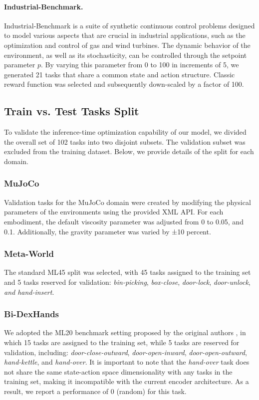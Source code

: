 \documentclass{article}
\theoremstyle{plain}
\theoremstyle{definition}
\theoremstyle{remark}
\begin{document}
\paragraph{Industrial-Benchmark.} Industrial-Benchmark \cite{Hein_2017} is a suite of synthetic continuous control problems designed to model various aspects that are crucial in industrial applications, such as the optimization and control of gas and wind turbines. The dynamic behavior of the environment, as well as its stochasticity, can be controlled through the setpoint parameter $p$. By varying this parameter from 0 to 100 in increments of 5, we generated 21 tasks that share a common state and action structure. Classic reward function was selected and subsequently down-scaled by a factor of 100.
\subsection{Train vs. Test Tasks Split}\label{appendix:dataset:train-test-split}
To validate the inference-time optimization capability of our model, we divided the overall set of 102 tasks into two disjoint subsets. The validation subset was excluded from the training dataset. Below, we provide details of the split for each domain.
\subsubsection{MuJoCo}\label{appendix:dataset:train-test-split:mujoco} Validation tasks for the MuJoCo domain were created by modifying the physical parameters of the environments using the provided XML API. For each embodiment, the default viscosity parameter was adjusted from 0 to 0.05, and 0.1. Additionally, the gravity parameter was varied by ±10 percent.
\subsubsection{Meta-World}\label{appendix:dataset:train-test-split:meta-world} The standard ML45 split was selected, with 45 tasks assigned to the training set and 5 tasks reserved for validation: \textit{bin-picking}, \textit{box-close}, \textit{door-lock}, \textit{door-unlock}, \textit{and hand-insert}.
\subsubsection{Bi-DexHands}\label{appendix:dataset:train-test-split:bidexhands} We adopted the ML20 benchmark setting proposed by the original authors \cite{chen2022humanlevelbimanualdexterousmanipulation}, in which 15 tasks are assigned to the training set, while 5 tasks are reserved for validation, including: \textit{door-close-outward}, \textit{door-open-inward}, \textit{door-open-outward}, \textit{hand-kettle}, and \textit{hand-over}. It is important to note that the \textit{hand-over} task does not share the same state-action space dimensionality with any tasks in the training set, making it incompatible with the current encoder architecture. As a result, we report a performance of 0 (random) for this task.
\end{document}
